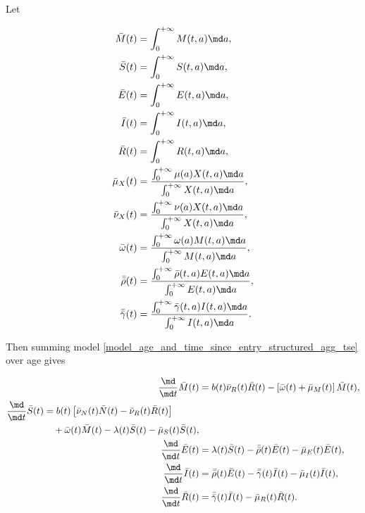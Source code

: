 \documentclass{jpmarticle}
\let\subequationsorig\subequations%
\let\endsubequationsorig\endsubequations%
\renewenvironment{subequations}{
  \subequationsorig
  \renewcommand{\theequation}{\theparentequation.\arabic{equation}}
}{
  \endsubequationsorig
}
\begin{document}
Let
\begin{subequations}
  \begin{align}
    \bar{M}(t) &= \int_0^{+\infty} M(t, a) \md a,
    \\
    \bar{S}(t) &= \int_0^{+\infty} S(t, a) \md a,
    \\
    \bar{E}(t) &= \int_0^{+\infty} E(t, a) \md a,
    \\
    \bar{I}(t) &= \int_0^{+\infty} I(t, a) \md a,
    \\
    \bar{R}(t) &= \int_0^{+\infty} R(t, a) \md a,
    \\
    \bar{\mu}_X(t)
    &= \frac{\int_0^{+\infty} \mu(a) X(t, a) \md a}
    {\int_0^{+\infty} X(t, a) \md a},
    \\
    \bar{\nu}_X(t)
    &= \frac{\int_0^{+\infty} \nu(a) X(t, a) \md a}
    {\int_0^{+\infty} X(t, a) \md a},
    \\
    \bar{\omega}(t)
    &= \frac{\int_0^{+\infty} \omega(a) M(t, a) \md a}
    {\int_0^{+\infty} M(t, a) \md a},
    \\
    \bar{\bar{\rho}}(t)
    &= \frac{\int_0^{+\infty} \bar{\rho}(t, a) E(t, a) \md a}
    {\int_0^{+\infty} E(t, a) \md a},
    \\
    \bar{\bar{\gamma}}(t)
    &= \frac{\int_0^{+\infty} \bar{\gamma}(t, a) I(t, a) \md a}
    {\int_0^{+\infty} I(t, a) \md a}.
  \end{align}
\end{subequations}
Then summing model
\eqref{model_age_and_time_since_entry_structured_agg_tse} over age
gives
\begin{subequations}
  \label{model_age_and_time_since_entry_structured_agg_tse_age}
  \begin{align}
    \frac{\md}{\md t} \bar{M}(t)
    &= b(t) \bar{\nu}_R(t) \bar{R}(t)
    - \left[\bar{\omega}(t) + \bar{\mu}_M(t)\right]
    \bar{M}(t),
    \\
    \begin{split}
      \frac{\md}{\md t} \bar{S}(t)
      &= b(t) \left[\bar{\nu}_N(t) \bar{N}(t)
        - \bar{\nu}_R(t) \bar{R}(t)\right]
      \\ & \quad {}
      + \bar{\omega}(t) \bar{M}(t)
      - \lambda(t) \bar{S}(t)
      - \bar{\mu}_S(t) \bar{S}(t),
    \end{split}
    \\
    \frac{\md}{\md t} \bar{E}(t)
    &= \lambda(t) \bar{S}(t)
    - \bar{\bar{\rho}}(t) \bar{E}(t)
    - \bar{\mu}_E(t) \bar{E}(t),
    \\
    \frac{\md}{\md t} \bar{I}(t)
    &= \bar{\bar{\rho}}(t) \bar{E}(t)
      - \bar{\bar{\gamma}}(t) \bar{I}(t)
      - \bar{\mu}_I(t) \bar{I}(t),
    \\
    \frac{\md}{\md t} \bar{R}(t)
    &= \bar{\bar{\gamma}}(t) \bar{I}(t)
    - \bar{\mu}_R(t) \bar{R}(t).
  \end{align}
\end{subequations}
\end{document}
